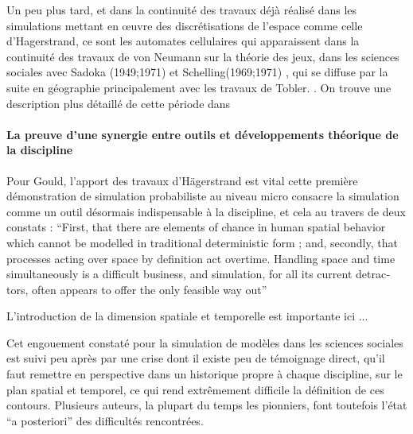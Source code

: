{Un peu plus tard, et dans la continuité des travaux déjà réalisé dans les simulations mettant en œuvre des discrétisations de l'espace comme celle d'Hagerstrand, ce sont les automates cellulaires qui apparaissent dans la continuité des travaux de von Neumann sur la théorie des jeux, dans les sciences sociales avec Sadoka (1949;1971) et Schelling(1969;1971) \autocite{Ganguly2003}, qui se diffuse par la suite en géographie principalement avec les travaux de Tobler. \autocite{Tobler1970b} \autocite{Tobler1979}. On trouve une description plus détaillé de cette période dans \autocite{Louail2010}

\paragraph{La preuve d'une synergie entre outils et développements théorique de la discipline}

Pour Gould, l'apport des travaux d'Hägerstrand est vital cette première démonstration de simulation probabiliste au niveau micro consacre la simulation comme un outil désormais indispensable à la discipline, et cela au travers de deux constats : \foreignquote{english}{First, that there are elements of chance in human spatial behavior which cannot be modelled in traditional deterministic form ; and, secondly, that processes acting over space by definition act overtime. Handling space and time simultaneously is a difficult business, and simulation, for all its current detractors, often appears to offer the only feasible way out} \autocite{Gould1970}

L'introduction de la dimension spatiale et temporelle est importante ici ... 


Cet engouement constaté pour la simulation de modèles dans les sciences sociales est suivi peu après par une crise dont il existe peu de témoignage direct, qu'il faut remettre en perspective dans un historique propre à chaque discipline, sur le plan spatial et temporel, ce qui rend extrêmement difficile la définition de ces contours. Plusieurs auteurs, la plupart du temps les pionniers, font toutefois l'état \foreignquote{latin}{a posteriori} des difficultés rencontrées.

}
